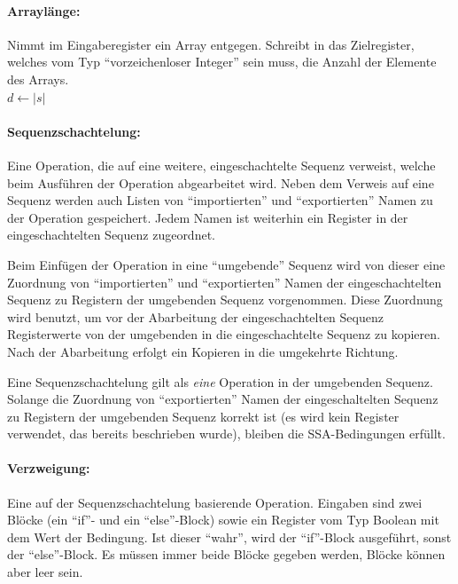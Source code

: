 \documentclass[twoside,a4paper,fleqn,12pt]{article}
\begin{document}
\paragraph{Arraylänge:} Nimmt im Eingaberegister ein Array entgegen. Schreibt in das Zielregister, welches vom Typ "`vorzeichenloser Integer"' sein muss,
die Anzahl der Elemente des Arrays.
\\\hspace*{1cm}$d \gets |s|$

\paragraph{Sequenzschachtelung:} Eine Operation, die auf eine weitere, eingeschachtelte Sequenz verweist, welche beim Ausführen der Operation abgearbeitet wird.
Neben dem Verweis auf eine Sequenz werden auch Listen von "`importierten"' und "`exportierten"' Namen zu der Operation gespeichert.
Jedem Namen ist weiterhin ein Register in der eingeschachtelten Sequenz zugeordnet.

Beim Einfügen der Operation in eine "`umgebende"' Sequenz wird von dieser eine Zuordnung von "`importierten"' und "`exportierten"' Namen der
eingeschachtelten Sequenz zu Registern der umgebenden Sequenz vorgenommen. 
Diese Zuordnung wird benutzt, um vor der Abarbeitung der eingeschachtelten Sequenz Registerwerte von der umgebenden in die eingeschachtelte Sequenz zu kopieren.
Nach der Abarbeitung erfolgt ein Kopieren in die umgekehrte Richtung.

Eine Sequenzschachtelung gilt als \emph{eine} Operation in der umgebenden Sequenz. Solange die Zuordnung von "`exportierten"' Namen der
eingeschaltelten Sequenz zu Registern der umgebenden Sequenz korrekt ist (es wird kein Register verwendet, das bereits beschrieben wurde), bleiben die SSA-Bedingungen erfüllt.

\paragraph{Verzweigung:} Eine auf der Sequenzschachtelung basierende Operation. Eingaben sind zwei Blöcke (ein ``if''- und ein ``else''-Block) sowie ein Register vom
Typ Boolean mit dem Wert der Bedingung. Ist dieser "`wahr"', wird der ``if''-Block ausgeführt, sonst der ``else''-Block. Es müssen immer beide Blöcke
gegeben werden, Blöcke können aber leer sein.
\end{document}
